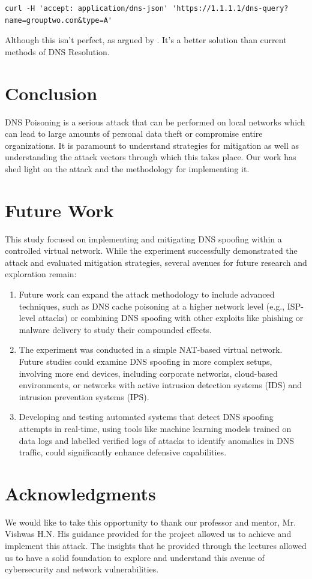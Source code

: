 \documentclass[conference,letterpaper]{IEEEtran}
\begin{document}
\begin{lstlisting}
curl -H 'accept: application/dns-json' 'https://1.1.1.1/dns-query?name=grouptwo.com&type=A'
\end{lstlisting}

Although this isn't perfect, as argued by \cite{csikorPrivacyDNSoverHTTPSRequiem2021}. It's a better solution than current methods of DNS Resolution.

\section{Conclusion}
DNS Poisoning is a serious attack that can be performed on local networks which can lead to large amounts of personal data theft or compromise entire organizations. It is paramount to understand strategies for mitigation as well as understanding the attack vectors through which this takes place. Our work has shed light on the attack and the methodology for implementing it.

\section{Future Work}
This study focused on implementing and mitigating DNS spoofing within a controlled virtual network. While the experiment successfully demonstrated the attack and evaluated mitigation strategies, several avenues for future research and exploration remain:

\begin{enumerate}
  \item Future work can expand the attack methodology to include advanced techniques, such as DNS cache poisoning\cite{trostleProtectingDNSCache2010} at a higher network level (e.g., ISP-level attacks) or combining DNS spoofing with other exploits like phishing or malware delivery to study their compounded effects.\cite{alharbiDNSPoisoningOperating2022}
  \item The experiment was conducted in a simple NAT-based virtual network. Future studies could examine DNS spoofing in more complex setups, involving more end devices, including corporate networks, cloud-based environments, or networks with active intrusion detection systems (IDS) and intrusion prevention systems (IPS).
  \item Developing and testing automated systems that detect DNS spoofing attempts in real-time, using tools like machine learning models trained on data logs and labelled verified logs of attacks to identify anomalies in DNS traffic, could significantly enhance defensive capabilities.
\end{enumerate}

\section{Acknowledgments}
We would like to take this opportunity to thank our professor and mentor, Mr. Vishwas H.N. His guidance provided for the project allowed us to achieve and implement this attack. The insights that he provided through the lectures allowed us to have a solid foundation to explore and understand this avenue of cybersecurity and network vulnerabilities.


\end{document}
